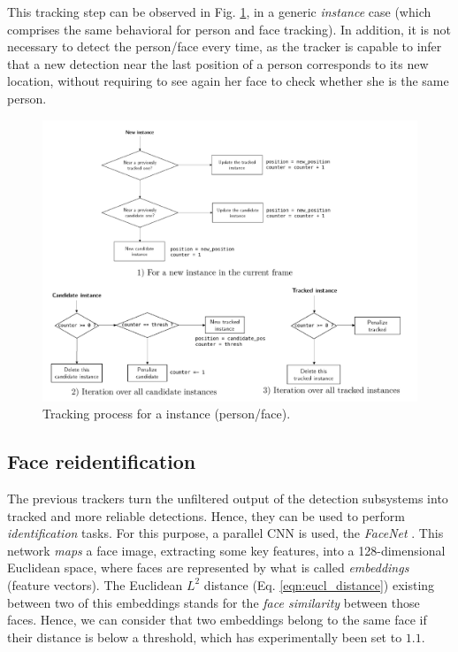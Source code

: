 This tracking step can be observed in Fig. \ref{fig:perception_tracker}, in a generic \emph{instance} case (which comprises the same behavioral for person and face tracking). In addition, it is not necessary to detect the person/face every time, as the tracker is capable to infer that a new detection near the last position of a person corresponds to its new location, without requiring to see again her face to check whether she is the same person.

\begin{figure}[h]
  \hspace{-0.4cm}
	\includegraphics[width=14cm]{images/flowcharts}
	\caption{Tracking process for a instance (person/face).}
	\label{fig:perception_tracker}
\end{figure}


\subsection{Face reidentification}

The previous trackers turn the unfiltered output of the detection subsystems into tracked and more reliable detections. Hence, they can be used to perform \emph{identification} tasks. For this purpose, a parallel CNN is used, the \emph{FaceNet} \cite{facenet}. This network \emph{maps} a face image, extracting some key features, into a 128-dimensional Euclidean space, where faces are represented by what is called \emph{embeddings} (feature vectors). The Euclidean $L^2$ distance (Eq. \ref{eqn:eucl_distance}) existing between two of this embeddings stands for the \emph{face similarity} between those faces. Hence, we can consider that two embeddings belong to the same face if their distance is below a threshold, which has experimentally been set to $1.1$.

